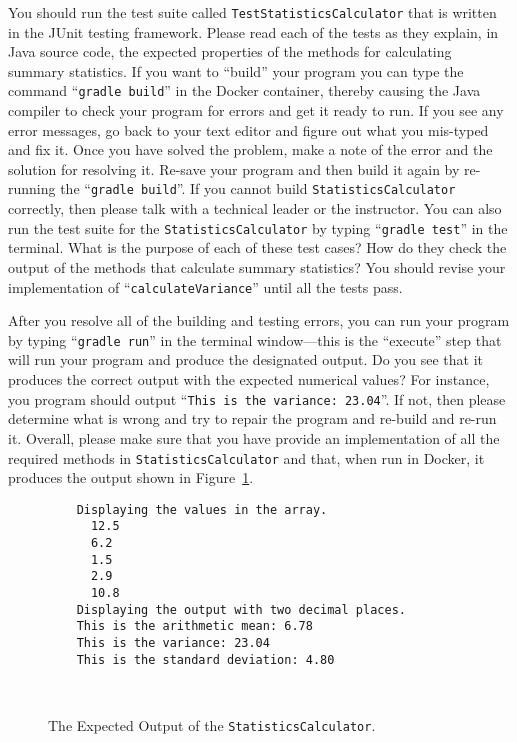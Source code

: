 \documentclass[11pt]{article}
\newcommand{\mainprogram}{\lstinline{StatisticsCalculator}}
\newcommand{\testprogram}{\lstinline{TestStatisticsCalculator}}
\newcommand{\gradlebuild}{\command{gradle build}}
\newcommand{\gradletest}{\command{gradle test}}
\newcommand{\gradlerun}{\command{gradle run}}
\newcommand{\command}[1]{``\lstinline{#1}''}
\newcommand{\step}[1]{``{#1}''}
\begin{document}
You should run the test suite called \testprogram{} that is written in the JUnit
testing framework. Please read each of the tests as they explain, in Java source
code, the expected properties of the methods for calculating summary statistics.
If you want to \step{build} your program you can type the command \gradlebuild{}
in the Docker container, thereby causing the Java compiler to check your program
for errors and get it ready to run. If you see any error messages, go back to
your text editor and figure out what you mis-typed and fix it. Once you have
solved the problem, make a note of the error and the solution for resolving it.
Re-save your program and then build it again by re-running the \gradlebuild{}.
If you cannot build \mainprogram{} correctly, then please talk with a technical
leader or the instructor. You can also run the test suite for the \mainprogram{}
by typing \gradletest{} in the terminal. What is the purpose of each of these
test cases? How do they check the output of the methods that calculate summary
statistics? You should revise your implementation of \command{calculateVariance}
until all the tests pass.

After you resolve all of the building and testing errors, you can run your
program by typing \gradlerun{} in the terminal window---this is the ``execute''
step that will run your program and produce the designated output. Do you see
that it produces the correct output with the expected numerical values? For
instance, you program should output \command{This is the variance: 23.04}. If
not, then please determine what is wrong and try to repair the program and
re-build and re-run it.
%
Overall, please make sure that you have provide an implementation of all the
required methods in \mainprogram{} and that, when run in Docker, it produces the
output shown in Figure~\ref{fig:output}.

\begin{figure}[t]
  \centering

  \begin{verbatim}
    Displaying the values in the array.
      12.5
      6.2
      1.5
      2.9
      10.8
    Displaying the output with two decimal places.
    This is the arithmetic mean: 6.78
    This is the variance: 23.04
    This is the standard deviation: 4.80
  \end{verbatim}

  \vspace*{-.25in}
  \caption{The Expected Output of the \mainprogram{}.}~\label{fig:output}
  \vspace*{-.25in}

\end{figure}
\end{document}
